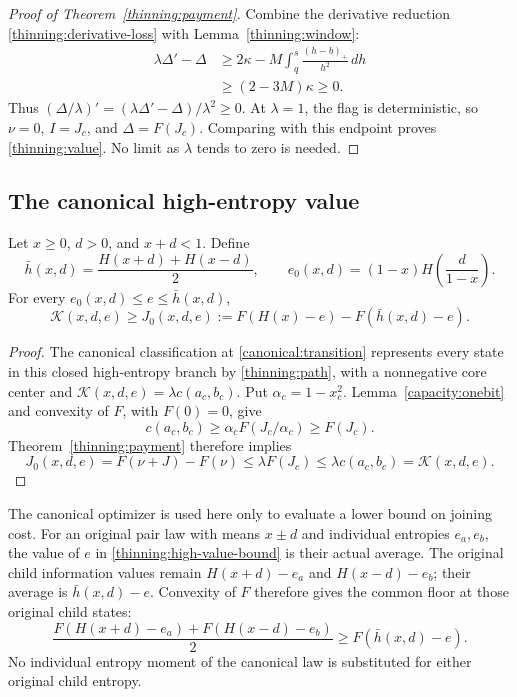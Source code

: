 \begin{proof}[Proof of Theorem~\ref{thinning:payment}]
Combine the derivative reduction \eqref{thinning:derivative-loss}
with Lemma~\ref{thinning:window}:
\begin{align*}
 \lambda\Delta'-\Delta
 &\ge2\kappa-M\int_q^s\frac{(h-b)_+}{h^2}\,dh\\
 &\ge(2-3M)\kappa\ge0.
\end{align*}
Thus
$(\Delta/\lambda)'=(\lambda\Delta'-\Delta)/\lambda^2\ge0$.
At $\lambda=1$, the flag is deterministic, so $\nu=0$, $I=J_c$,
and $\Delta=F(J_c)$.  Comparing with this endpoint proves
\eqref{thinning:value}.  No limit as $\lambda$ tends to zero is needed.
\end{proof}

\subsection{The canonical high-entropy value}

\begin{theorem}
\label{thinning:high-value}
Let $x\ge0$, $d>0$, and $x+d<1$.  Define
\[
 \bar h(x,d)=\frac{H(x+d)+H(x-d)}2,\qquad
 e_0(x,d)=(1-x)H\!\left(\frac d{1-x}\right).
\]
For every $e_0(x,d)\le e\le\bar h(x,d)$,
\begin{equation}
\label{thinning:high-value-bound}
 \mathcal K(x,d,e)\ge
 J_0(x,d,e):=F(H(x)-e)-F(\bar h(x,d)-e).
\end{equation}
\end{theorem}

\begin{proof}
The canonical classification at \eqref{canonical:transition} represents
every state in this closed high-entropy branch by
\eqref{thinning:path}, with a nonnegative core center and
$\mathcal K(x,d,e)=\lambda c(a_c,b_c)$.
Put $\alpha_c=1-x_c^2$.  Lemma~\ref{capacity:onebit} and convexity
of $F$, with $F(0)=0$, give
\[
 c(a_c,b_c)\ge\alpha_c F(J_c/\alpha_c)\ge F(J_c).
\]
Theorem~\ref{thinning:payment} therefore implies
\[
 J_0(x,d,e)=F(\nu+J)-F(\nu)
 \le\lambda F(J_c)
 \le\lambda c(a_c,b_c)=\mathcal K(x,d,e).
\]
\end{proof}

The canonical optimizer is used here only to evaluate a lower bound
on joining cost.  For an original pair law with means $x\pm d$ and
individual entropies $e_a,e_b$, the value of $e$ in
\eqref{thinning:high-value-bound} is their actual average.  The
original child information values remain $H(x+d)-e_a$ and
$H(x-d)-e_b$; their average is $\bar h(x,d)-e$.
Convexity of $F$ therefore gives the common floor at those original
child states:
\[
 \frac{F(H(x+d)-e_a)+F(H(x-d)-e_b)}2
 \ge F(\bar h(x,d)-e).
\]
No individual entropy moment of the canonical law is substituted for
either original child entropy.
